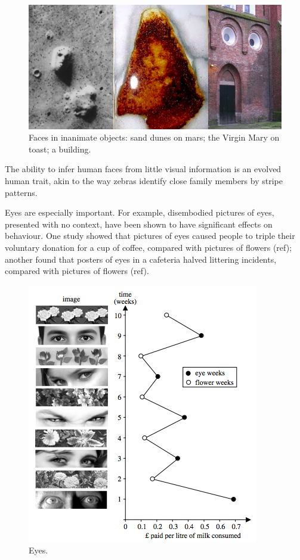\begin{figure}
  \begin{center}
    \includegraphics[width=\textwidth]{content/assets/mlp--faces}
  \end{center}
  \caption{Faces in inanimate objects: sand dunes on mars; the Virgin Mary on toast; a building.}
\end{figure}

The ability to infer human faces from little visual information is an evolved human trait, akin to the way zebras identify close family members by stripe patterns.

Eyes are especially important. For example, disembodied pictures of eyes, presented with no context, have been shown to have significant effects on behaviour. One study showed that pictures of eyes caused people to triple their voluntary donation for a cup of coffee, compared with pictures of flowers (ref); another found that posters of eyes in a cafeteria halved littering incidents, compared with pictures of flowers (ref).

\begin{figure}
  \begin{center}
    \includegraphics{content/assets/mlp--eyes}
  \end{center}
  \caption{Eyes.}
\end{figure}

